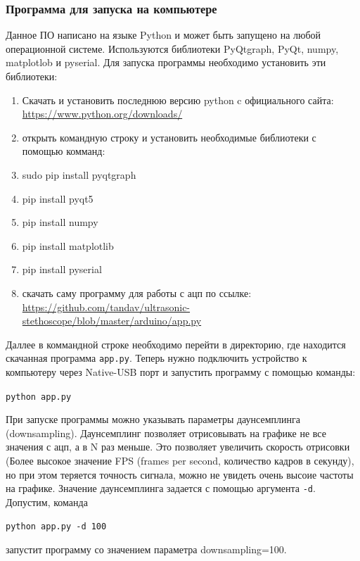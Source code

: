 \documentclass[../paper.tex]{subfiles}
\begin{document}
\subsubsection{Программа для запуска на компьютере}
Данное ПО написано на языке Python и может быть запущено на любой операционной системе. Используются библиотеки PyQtgraph, PyQt, numpy, matplotlob и pyserial. Для запуска программы необходимо установить эти библиотеки:
\begin{enumerate}
  \item Скачать и установить последнюю версию python c официального сайта: \url{https://www.python.org/downloads/}
  \item открыть командную строку и установить необходимые библиотеки с помощью комманд:
  \item sudo pip install pyqtgraph
  \item pip install pyqt5
  \item pip install numpy
  \item pip install matplotlib
  \item pip install pyserial
  \item скачать саму программу для работы с ацп по ссылке: \url{https://github.com/tandav/ultrasonic-stethoscope/blob/master/arduino/app.py}
\end{enumerate}

Даллее в коммандной строке необходимо перейти в директорию, где находится скачанная программа \verb|app.py|. Теперь нужно подключить устройство к компьютеру через Native-USB порт и запустить программу с помощью команды:

\verb|python app.py|

При запуске программы можно указывать параметры даунсемплинга (downsampling). Даунсемплинг позволяет отрисовывать на графике не все значения с ацп, а в N раз меньше. Это позволяет увеличить скорость отрисовки (Более высокое значение FPS (frames per second, количество кадров в секунду), но при этом теряется точность сигнала, можно не увидеть очень высоие частоты на графике. Значение даунсемплинга задается с помощью аргумента \verb|-d|. Допустим, команда

\verb|python app.py -d 100|

запустит программу со значением параметра downsampling=100.
\end{document}
